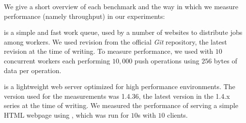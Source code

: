 

We give a short overview of each benchmark and the way in which we
measure performance (namely throughput) in our experiments:

is a simple and fast work queue, used by a number of websites to
distribute jobs among workers. We used revision  from the
official \textit{Git} repository, the latest revision at the time of
writing.  To measure performance, we used
with $10$ concurrent workers each performing $10,000$ push operations
using $256$ bytes of data per operation.

is a lightweight web server optimized for high performance
environments. The version used for the measurements was 1.4.36,
the latest version in the 1.4.x series at the time of writing.
We measured the performance of serving a simple HTML webpage using
, which was run for $10$s with $10$ clients.





